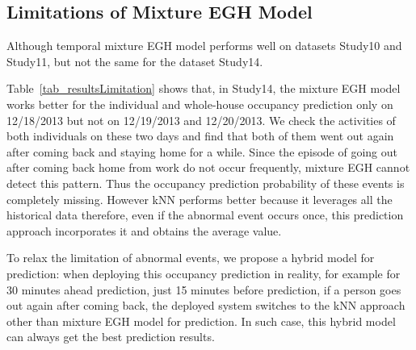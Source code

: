 \subsection{Limitations of Mixture EGH Model}
Although temporal mixture EGH model performs well on datasets Study10 and Study11, 
but not the same for the dataset Study14. 

Table~\ref{tab_resultsLimitation} shows that, 
in Study14, 
the mixture EGH model works better for the individual and whole-house occupancy prediction 
only on 12/18/2013 but not on 12/19/2013 and 12/20/2013. 
We check the activities of both individuals on these two days 
and find that both of them went out again 
after coming back and staying home for a while.
Since the episode of going out after coming back home from work 
do not occur frequently, mixture EGH cannot detect this pattern. Thus the occupancy prediction probability of these events 
is completely missing. However kNN performs better because it leverages all the 
historical data therefore, even if the abnormal event occurs once, 
this prediction approach incorporates it and obtains the average value. 

To relax the limitation of abnormal events, 
we propose a hybrid model for prediction:
when deploying this occupancy prediction in reality, 
for example for 30 minutes ahead prediction, 
just 15 minutes before prediction, if a person goes out again after coming back, 
the deployed system switches to the kNN approach other than mixture EGH model for prediction. In such case, this hybrid model can always get the best prediction results. 

